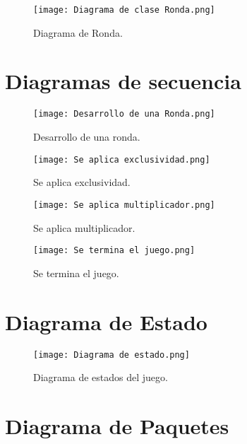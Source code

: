 \documentclass[titlepage,a4paper]{article}
\begin{document}
\begin{figure}[H]
\centering
\texttt{[image: Diagrama de clase Ronda.png]}
\caption{\label{fig:seq01}Diagrama de Ronda.}
\end{figure}


\section{Diagramas de secuencia}\label{sec:diagramasdesecuencia}


\begin{figure}[H]
\centering

\texttt{[image: Desarrollo de una Ronda.png]}
\caption{\label{fig:seq01}Desarrollo de una ronda.}
\end{figure}

\begin{figure}[H]
\centering
\texttt{[image: Se aplica exclusividad.png]}
\caption{\label{fig:seq01}Se aplica exclusividad.}
\end{figure}

\begin{figure}[H]
\centering
\texttt{[image: Se aplica multiplicador.png]}
\caption{\label{fig:seq01}Se aplica multiplicador.}
\end{figure}

\begin{figure}[H]
\centering
\texttt{[image: Se termina el juego.png]}
\caption{\label{fig:seq01}Se termina el juego.}
\end{figure}


\section{Diagrama de Estado}\label{sec:diagramasdeestado}


\begin{figure}[H]
\centering
\texttt{[image: Diagrama de estado.png]}
\caption{\label{fig:seq01}Diagrama de estados del juego.}
\end{figure}

\section{Diagrama de Paquetes}\label{sec:diagramasdepaquete}
\end{document}
